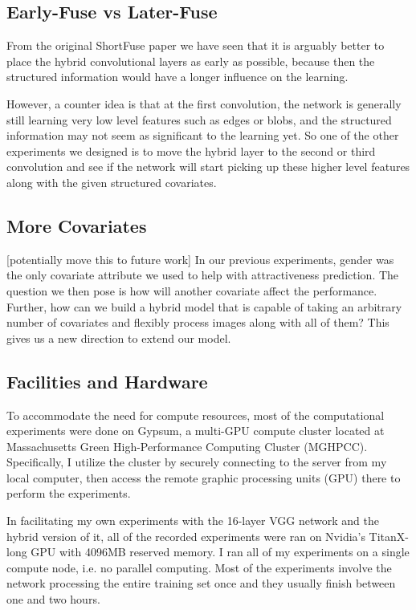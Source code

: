 \documentclass[12pt]{article}
\begin{document}
\subsection{Early-Fuse vs Later-Fuse}
From the original ShortFuse paper we have seen that it is arguably better to place the hybrid convolutional layers as early as possible, because then the structured information would have a longer influence on the learning. 

However, a counter idea is that at the first convolution, the network is generally still learning very low level features such as edges or blobs, and the structured information may not seem as significant to the learning yet. So one of the other experiments we designed is to move the hybrid layer to the second or third convolution and see if the network will start picking up these higher level features along with the given structured covariates. 

\subsection{More Covariates}
[potentially move this to future work]
In our previous experiments, gender was the only covariate attribute we used to help with attractiveness prediction. The question we then pose is how will another covariate affect the performance. Further, how can we build a hybrid model that is capable of taking an arbitrary number of covariates and flexibly process images along with all of them? This gives us a new direction to extend our model. 

\subsection{Facilities and Hardware}
To accommodate the need for compute resources, most of the computational experiments were done on Gypsum, a multi-GPU compute cluster located at Massachusetts Green High-Performance Computing Cluster (MGHPCC). Specifically, I utilize the cluster by securely connecting to the server from my local computer, then access the remote graphic processing units (GPU) there to perform the experiments. 

In facilitating my own experiments with the 16-layer VGG network and the hybrid version of it, all of the recorded experiments were ran on Nvidia's TitanX-long GPU with 4096MB reserved memory. I ran all of my experiments on a single compute node, i.e. no parallel computing. Most of the experiments involve the network processing the entire training set once and they usually finish between one and two hours. 
\end{document}
